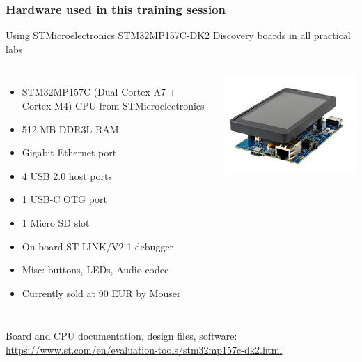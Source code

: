 \begin{frame}
\frametitle{Hardware used in this training session}
  Using STMicroelectronics STM32MP157C-DK2 Discovery boards in all practical labs
  \begin{columns}
    {\footnotesize
    \begin{itemize}
    \item STM32MP157C (Dual Cortex-A7 + Cortex-M4) CPU from STMicroelectronics
    \item 512 MB DDR3L RAM
    \item Gigabit Ethernet port
    \item 4 USB 2.0 host ports
    \item 1 USB-C OTG port
    \item 1 Micro SD slot
    \item On-board ST-LINK/V2-1 debugger
    \item Misc: buttons, LEDs, Audio codec
    \item Currently sold at 90 EUR by Mouser
    \end{itemize}
    }
    \includegraphics[width=\textwidth]{slides/discovery-board/discovery-board.jpg}
  \end{columns}
  \vspace{1em}
  {\small
  Board and CPU documentation, design files, software:
  \url{https://www.st.com/en/evaluation-tools/stm32mp157c-dk2.html}
  }
\end{frame}
